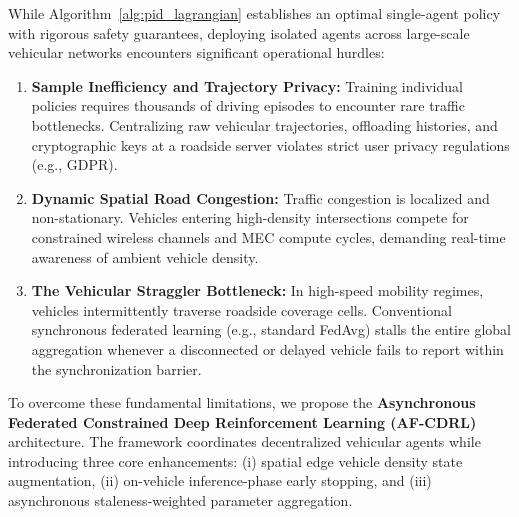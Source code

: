 \documentclass[12pt,a4paper]{article}
\begin{document}
While Algorithm~\ref{alg:pid_lagrangian} establishes an optimal single-agent policy with rigorous safety guarantees, deploying isolated agents across large-scale vehicular networks encounters significant operational hurdles:
\begin{enumerate}
    \item \textbf{Sample Inefficiency and Trajectory Privacy:} Training individual policies requires thousands of driving episodes to encounter rare traffic bottlenecks. Centralizing raw vehicular trajectories, offloading histories, and cryptographic keys at a roadside server violates strict user privacy regulations (e.g., GDPR).
    \item \textbf{Dynamic Spatial Road Congestion:} Traffic congestion is localized and non-stationary. Vehicles entering high-density intersections compete for constrained wireless channels and MEC compute cycles, demanding real-time awareness of ambient vehicle density.
    \item \textbf{The Vehicular Straggler Bottleneck:} In high-speed mobility regimes, vehicles intermittently traverse roadside coverage cells. Conventional synchronous federated learning (e.g., standard FedAvg) stalls the entire global aggregation whenever a disconnected or delayed vehicle fails to report within the synchronization barrier.
\end{enumerate}

To overcome these fundamental limitations, we propose the \textbf{Asynchronous Federated Constrained Deep Reinforcement Learning (AF-CDRL)} architecture. The framework coordinates decentralized vehicular agents while introducing three core enhancements: (i) spatial edge vehicle density state augmentation, (ii) on-vehicle inference-phase early stopping, and (iii) asynchronous staleness-weighted parameter aggregation.
\end{document}
